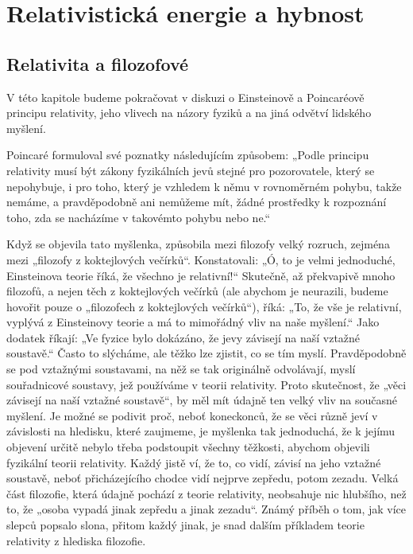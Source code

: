 {
\chapter{Relativistická energie a hybnost}\label{fyz:IchapXVI}
\minitoc
  \section{Relativita a filozofové}\label{fyz:IchapXVIsecI}
    V této kapitole budeme pokračovat v diskuzi o Einsteinově a Poincaréově principu relativity, 
    jeho vlivech na názory fyziků a na jiná odvětví lidského myšlení.
    
    Poincaré formuloval své poznatky následujícím způsobem: „Podle principu relativity musí být 
    zákony fyzikálních jevů stejné pro pozorovatele, který se nepohybuje, i pro toho, který je 
    vzhledem k němu v rovnoměrném pohybu, takže nemáme, a pravděpodobně ani nemůžeme mít, žádné 
    prostředky k rozpoznání toho, zda se nacházíme v takovémto pohybu nebo ne.“
    
    Když se objevila tato myšlenka, způsobila mezi filozofy velký rozruch, zejména mezi „filozofy z 
    koktejlových večírků“. Konstatovali: „Ó, to je velmi jednoduché, Einsteinova teorie říká, že 
    všechno je relativní!“ Skutečně, až překvapivě mnoho filozofů, a nejen těch z koktejlových 
    večírků (ale abychom je neurazili, budeme hovořit pouze o „filozofech z koktejlových večírků“), 
    říká: „To, že vše je relativní, vyplývá z Einsteinovy teorie a má to mimořádný vliv na naše 
    myšlení.“ Jako dodatek říkají: „Ve fyzice bylo dokázáno, že jevy závisejí na naší vztažné 
    soustavě.“ Často to slýcháme, ale těžko lze zjistit, co se tím myslí. Pravděpodobně se pod 
    vztažnými soustavami, na něž se tak originálně odvolávají, myslí souřadnicové soustavy, jež 
    používáme v teorii relativity. Proto skutečnost, že „věci závisejí na naší vztažné soustavě“, 
    by měl mít údajně ten velký vliv na současné myšlení. Je možné se podivit proč, neboť 
    koneckonců, že se věci různě jeví v závislosti na hledisku, které zaujmeme, je myšlenka tak 
    jednoduchá, že k jejímu objevení určitě nebylo třeba podstoupit všechny těžkosti, abychom 
    objevili fyzikální teorii relativity. Každý jistě ví, že to, co vidí, závisí na jeho vztažné 
    soustavě, neboť přicházejícího chodce vidí nejprve zepředu, potom zezadu. Velká část filozofie, 
    která údajně pochází z teorie relativity, neobsahuje nic hlubšího, než to, že „osoba vypadá 
    jinak zepředu a jinak zezadu“. Známý příběh o tom, jak více slepců popsalo slona, přitom každý 
    jinak, je snad dalším příkladem teorie relativity z hlediska filozofie.
    
}
